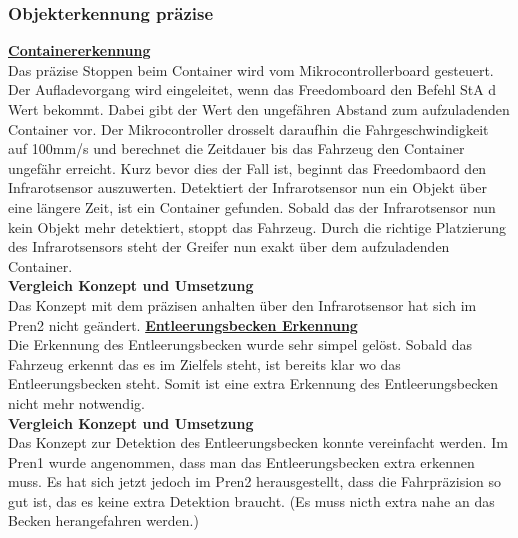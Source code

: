 \subsubsection{Objekterkennung präzise}
\underline{\textbf{Containererkennung}}\\[0.2cm]
Das präzise Stoppen beim Container wird vom Mikrocontrollerboard gesteuert. Der Aufladevorgang wird eingeleitet, wenn das Freedomboard den Befehl StA d Wert bekommt. Dabei gibt der Wert den ungefähren Abstand zum aufzuladenden Container vor. Der Mikrocontroller drosselt daraufhin die Fahrgeschwindigkeit auf 100mm/s und berechnet die Zeitdauer bis das Fahrzeug den Container ungefähr erreicht. Kurz bevor dies der Fall ist, beginnt das Freedombaord den Infrarotsensor auszuwerten. Detektiert der Infrarotsensor nun ein Objekt über eine längere Zeit, ist ein Container gefunden. Sobald das der Infrarotsensor nun kein Objekt mehr detektiert, stoppt das Fahrzeug. Durch die richtige Platzierung des Infrarotsensors steht der Greifer nun exakt über dem aufzuladenden Container.\\[0.2cm]
\textbf{Vergleich Konzept und Umsetzung}\\[0.2cm]
Das Konzept mit dem präzisen anhalten über den Infrarotsensor hat sich im Pren2 nicht geändert.
%
\underline{\textbf{Entleerungsbecken Erkennung}} \\[0.2cm]
Die Erkennung des Entleerungsbecken wurde sehr simpel gelöst. Sobald das Fahrzeug erkennt das es im Zielfels steht, ist bereits klar wo das Entleerungsbecken steht. Somit ist eine extra Erkennung des Entleerungsbecken nicht mehr notwendig.\\[0.2cm]
\textbf{Vergleich Konzept und Umsetzung}\\[0.2cm]
Das Konzept zur Detektion des Entleerungsbecken konnte vereinfacht werden. Im Pren1 wurde angenommen, dass man das Entleerungsbecken extra erkennen muss. Es hat sich jetzt jedoch im Pren2 herausgestellt, dass die Fahrpräzision so gut ist, das es keine extra Detektion braucht. (Es muss nicth extra nahe an das Becken herangefahren werden.)